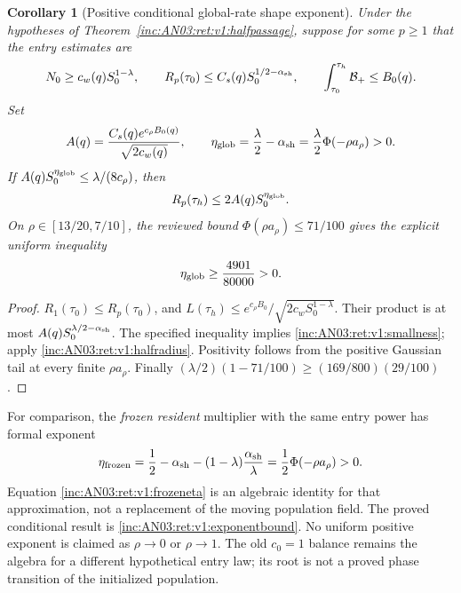 \documentclass[11pt]{article}
\numberwithin{equation}{section}
\newtheorem{corollary}[theorem]{Corollary}
\theoremstyle{remark}\newtheorem{remark}[theorem]{Remark}
\newcommand{\1}{\mathbf 1}
\begin{document}
\begin{corollary}[Positive conditional global-rate shape exponent]
\label{inc:AN03:ret:v1:exponent}
Under the hypotheses of Theorem~\ref{inc:AN03:ret:v1:halfpassage}, suppose
for some $p\ge1$ that the \emph{entry} estimates are
\begin{equation}\label{inc:AN03:ret:v1:entryhyp}
 N_0\ge c_w(q)S_0^{1-\lambda},\qquad
 R_p(\tau_0)\le C_s(q)S_0^{1/2-\alpha_{\rm sh}},\qquad
 \int_{\tau_0}^{\tau_h}\mathcal B_+\le B_0(q).
\end{equation}
Set
\[
 A(q)=\frac{C_s(q)e^{c_\rho B_0(q)}}{\sqrt{2c_w(q)}},
 \qquad
 \eta_{\rm glob}=\frac\lambda2-\alpha_{\rm sh}
 =\frac\lambda2\Phi(-\rho a_\rho)>0.
\]
If $A(q)S_0^{\eta_{\rm glob}}\le\lambda/(8c_\rho)$, then
\begin{equation}\label{inc:AN03:ret:v1:exponentbound}
 R_p(\tau_h)\le2A(q)S_0^{\eta_{\rm glob}}.
\end{equation}
On $\rho\in[13/20,7/10]$, the reviewed bound
$\Phi(\rho a_\rho)\le71/100$ gives the explicit uniform inequality
\begin{equation}\label{inc:AN03:ret:v1:uniformeta}
 \eta_{\rm glob}\ge\frac{4901}{80000}>0.
\end{equation}
\end{corollary}
\begin{proof}
$R_1(\tau_0)\le R_p(\tau_0)$, and
$L(\tau_h)\le e^{c_\rho B_0}/\sqrt{2c_wS_0^{1-\lambda}}$.
Their product is at most $A(q)S_0^{\lambda/2-\alpha_{\rm sh}}$.
The specified inequality implies
\eqref{inc:AN03:ret:v1:smallness}; apply
\eqref{inc:AN03:ret:v1:halfradius}.
Positivity follows from the positive Gaussian tail at every finite
$\rho a_\rho$. Finally
$(\lambda/2)(1-71/100)\ge(169/800)(29/100)$.
\end{proof}

For comparison, the \emph{frozen resident} multiplier with the same entry
power has formal exponent
\begin{equation}\label{inc:AN03:ret:v1:frozeneta}
 \eta_{\rm frozen}
 =\frac12-\alpha_{\rm sh}-(1-\lambda)\frac{\alpha_{\rm sh}}\lambda
 =\frac12\Phi(-\rho a_\rho)>0.
\end{equation}
Equation \eqref{inc:AN03:ret:v1:frozeneta} is an algebraic identity for
that approximation, not a replacement of the moving population field.
The proved conditional result is \eqref{inc:AN03:ret:v1:exponentbound}.
No uniform positive exponent is claimed as $\rho\to0$ or $\rho\to1$.
The old $c_0=1$ balance remains the algebra for a different hypothetical
entry law; its root is not a proved phase transition of the initialized
population.
\end{document}
